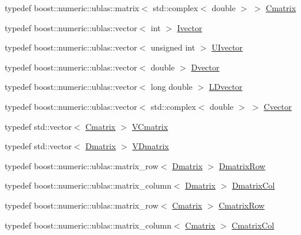 \begin{DoxyCompactItemize}
typedef boost\+::numeric\+::ublas\+::matrix$<$ std\+::complex$<$ double $>$ $>$ \hyperlink{namespacetsa_a86348fef1603a135fe5fba9e5f5486ee}{Cmatrix}
\item 
typedef boost\+::numeric\+::ublas\+::vector$<$ int $>$ \hyperlink{namespacetsa_ac73258f98dd6a665991e1c9a71df691f}{Ivector}
\item 
typedef boost\+::numeric\+::ublas\+::vector$<$ unsigned int $>$ \hyperlink{namespacetsa_abed2840bd46d70e5aa1122cf7d06a6ed}{U\+Ivector}
\item 
typedef boost\+::numeric\+::ublas\+::vector$<$ double $>$ \hyperlink{namespacetsa_a8900fb03d849baf447a1a0efe2561fb2}{Dvector}
\item 
typedef boost\+::numeric\+::ublas\+::vector$<$ long double $>$ \hyperlink{namespacetsa_ad1e65e148c1b8be13ee4da5b246b5adf}{L\+Dvector}
\item 
typedef boost\+::numeric\+::ublas\+::vector$<$ std\+::complex$<$ double $>$ $>$ \hyperlink{namespacetsa_a054d1045ead95a65819e9e5722baf600}{Cvector}
\item 
typedef std\+::vector$<$ \hyperlink{namespacetsa_a86348fef1603a135fe5fba9e5f5486ee}{Cmatrix} $>$ \hyperlink{namespacetsa_a58da96b64dcaa37bc6d90a20f38220c9}{V\+Cmatrix}
\item 
typedef std\+::vector$<$ \hyperlink{namespacetsa_ad260cd21c1891c4ed391fe788569aba4}{Dmatrix} $>$ \hyperlink{namespacetsa_a6dd7105c3202ef00a213d7c029f5b248}{V\+Dmatrix}
\item 
typedef boost\+::numeric\+::ublas\+::matrix\+\_\+row$<$ \hyperlink{namespacetsa_ad260cd21c1891c4ed391fe788569aba4}{Dmatrix} $>$ \hyperlink{namespacetsa_aeaf3be962a114beef3d9e89b0fb49bf4}{Dmatrix\+Row}
\item 
typedef boost\+::numeric\+::ublas\+::matrix\+\_\+column$<$ \hyperlink{namespacetsa_ad260cd21c1891c4ed391fe788569aba4}{Dmatrix} $>$ \hyperlink{namespacetsa_a9903622809f0f8f0a38a520859ed5090}{Dmatrix\+Col}
\item 
typedef boost\+::numeric\+::ublas\+::matrix\+\_\+row$<$ \hyperlink{namespacetsa_a86348fef1603a135fe5fba9e5f5486ee}{Cmatrix} $>$ \hyperlink{namespacetsa_ad294f56c16152a1618cbe2f19b768e2e}{Cmatrix\+Row}
\item 
typedef boost\+::numeric\+::ublas\+::matrix\+\_\+column$<$ \hyperlink{namespacetsa_a86348fef1603a135fe5fba9e5f5486ee}{Cmatrix} $>$ \hyperlink{namespacetsa_a8516debea26c2f85600d808e777d39d2}{Cmatrix\+Col}
\end{DoxyCompactItemize}
